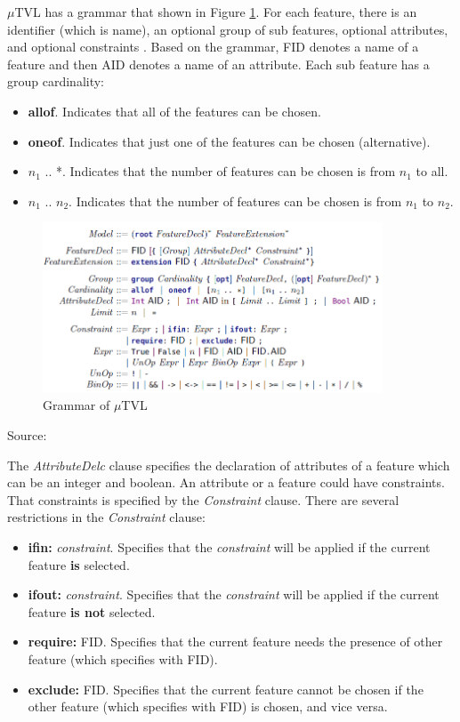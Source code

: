 $\mu$TVL has a grammar that shown in Figure \ref{fig:grammarFM}. For each feature, there is an identifier (which is name), an optional group of sub features, optional attributes, and optional constraints \citep{paper.clarke.variability,paper.hanle.ABStutorial}. Based on the grammar, FID denotes a name of a feature and then AID denotes a name of an attribute. Each sub feature has a group cardinality:
\begin{itemize}
	\item {\bf allof}. Indicates that all of the features can be chosen.
	\item {\bf oneof}. Indicates that just one of the features can be chosen (alternative).
	\item $n_{1}$ .. *. Indicates that the number of features can be chosen is from $n_{1}$ to all.
	\item $n_{1}$ .. $n_{2}$. Indicates that the number of features can be chosen is from $n_{1}$ to $n_{2}$.
\end{itemize}

\begin{figure}
	\centering
	\includegraphics[width=0.9\textwidth]
	{pics/grammarFM.png}
	\caption{Grammar of $\mu$TVL}
	\label{fig:grammarFM}
\end{figure}
\vspace{-1cm}
\begin{center}
	{\small Source: \citep{paper.clarke.variability}}
\end{center}

The {\it AttributeDelc} clause specifies the declaration of attributes of a feature which can be an integer and boolean. An attribute or a feature could have constraints. That constraints is specified by the {\it Constraint} clause. There are several restrictions in the {\it Constraint} clause:
\begin{itemize}
	\item {\bf ifin:} {\it constraint}. Specifies that the {\it constraint} will be applied if the current feature {\bf is} selected.
	\item {\bf ifout:} {\it constraint}.  Specifies that the {\it constraint} will be applied if the current feature {\bf is not} selected.
	\item {\bf require:} FID. Specifies that the current feature needs the presence of other feature (which specifies with FID).
	\item {\bf exclude:} FID. Specifies that the current feature cannot be chosen if the other feature (which specifies with FID) is chosen, and vice versa.
\end{itemize}

